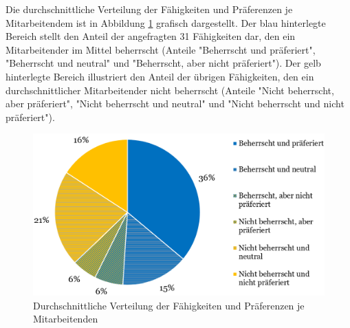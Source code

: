 Die durchschnittliche Verteilung der Fähigkeiten und Präferenzen je Mitarbeitendem ist in Abbildung \ref{fig:ergebnisse:abb1} grafisch dargestellt.
Der blau hinterlegte Bereich stellt den Anteil der angefragten 31 Fähigkeiten dar, den ein Mitarbeitender im Mittel beherrscht (Anteile "Beherrscht und präferiert", "Beherrscht und neutral" und "Beherrscht, aber nicht präferiert").
Der gelb hinterlegte Bereich illustriert den Anteil der übrigen Fähigkeiten, den ein durchschnittlicher Mitarbeitender nicht beherrscht (Anteile "Nicht beherrscht, aber präferiert", "Nicht beherrscht und neutral" und "Nicht beherrscht und nicht präferiert").

\begin{figure}
    \centering
	\includegraphics[width=1.0\textwidth]{gfx/verteilung-f-p.png}
	\caption[Durchschnittliche Verteilung der Fähigkeiten und Präferenzen je Mitarbeitenden]{Durchschnittliche Verteilung der Fähigkeiten und Präferenzen je Mitarbeitenden}
	\label{fig:ergebnisse:abb1}
\end{figure}

